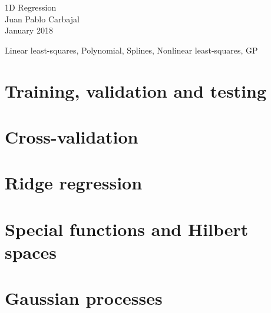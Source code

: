 \documentclass[10pt,english,final,a4paper]{exam}
\begin{document}
\begin{center}
{\Large 1D Regression}\\
Juan Pablo Carbajal\\
January 2018
\end{center}

\vspace{1.5em}

Linear least-squares, Polynomial, Splines, Nonlinear least-squares, GP


\section{Training, validation and testing}
\begin{questions}
\end{questions}

\section{Cross-validation}
\begin{questions}
\end{questions}

\section{Ridge regression}
\begin{questions}
\end{questions}

\section{Special functions and Hilbert spaces}
\begin{questions}
\end{questions}

\section{Gaussian processes}
\begin{questions}
\end{questions}
\end{document}
